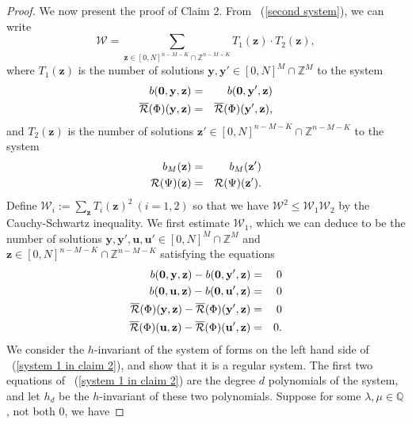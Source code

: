 \documentclass[12pt]{amsart}
\theoremstyle{definition}
\theoremstyle{remark}
\numberwithin{equation}{section}
\begin{document}
\begin{proof}
We now present the proof of Claim 2. From ~(\ref{second system}), we can write
$$
\mathcal{W} = \sum_{\mathbf{z} \in  [0,N]^{n-M-K} \cap \mathbb{Z}^{n-M-K}} T_1(\mathbf{z}) \cdot T_2(\mathbf{z}),
$$
where $T_1(\mathbf{z})$ is the number of solutions $\mathbf{y}, \mathbf{y}' \in [0,N]^{M} \cap \mathbb{Z}^{M}$
to the system
\begin{eqnarray}
{b}( \mathbf{0}, \mathbf{y}, \mathbf{z} ) &=&  {b}( \mathbf{0}, \mathbf{y}', \mathbf{z} )
\notag
\\
\overline{\mathcal{R}}(\Phi) (\mathbf{y}, \mathbf{z}) &=& \overline{\mathcal{R}}(\Phi) (\mathbf{y}', \mathbf{z}),
\notag
\end{eqnarray}
and $T_2(\mathbf{z})$ is the number of solutions $\mathbf{z}' \in  [0,N]^{n-M-K} \cap \mathbb{Z}^{n-M-K}$
to the system
\begin{eqnarray}
{b}_M( \mathbf{z} ) &=& {b}_M( \mathbf{z}' )
\notag
\\
{\mathcal{R}}(\Psi) ( \mathbf{z}) &=& {\mathcal{R}}(\Psi) (\mathbf{z}').
\notag
\end{eqnarray}
Define $\mathcal{W}_i :=\sum_{\mathbf{z}} T_i (\mathbf{z})^2 \ (i=1, 2)$ so that
we have $\mathcal{W}^2 \leq \mathcal{W}_1 \mathcal{W}_2$ by the Cauchy-Schwartz inequality.
We first estimate $\mathcal{W}_1$, which
we can deduce to be the number of solutions $\mathbf{y}, \mathbf{y}', \mathbf{u}, \mathbf{u}' \in [0,N]^M \cap \mathbb{Z}^M$
and $\mathbf{z} \in [0,N]^{n-M-K} \cap \mathbb{Z}^{n-M-K}$ satisfying the equations
\begin{eqnarray}
\label{system 1 in claim 2}
{b}( \mathbf{0}, \mathbf{y}, \mathbf{z} )  -  {b}( \mathbf{0}, \mathbf{y}', \mathbf{z} ) &=& 0
\\
{b}( \mathbf{0}, \mathbf{u}, \mathbf{z} ) - {b}( \mathbf{0}, \mathbf{u}', \mathbf{z} )  &=&  0
\notag
\\
\overline{\mathcal{R}}(\Phi) (\mathbf{y}, \mathbf{z}) - \overline{\mathcal{R}}(\Phi) (\mathbf{y}', \mathbf{z}) &=&  0
\notag
\\
\overline{\mathcal{R}}(\Phi) (\mathbf{u}, \mathbf{z}) - \overline{\mathcal{R}}(\Phi) (\mathbf{u}', \mathbf{z}) &=&  0.
\notag
\end{eqnarray}
We consider the $h$-invariant of the system of forms on the left hand side of ~(\ref{system 1 in claim 2}), and show that
it is a regular system. The first two equations of ~(\ref{system 1 in claim 2}) are the degree $d$ polynomials of the system, and let $h_d$ be the $h$-invariant of these two polynomials.
Suppose for some $\lambda, \mu \in \mathbb{Q}$, not both $0$, we have

\end{proof}
\end{document}

